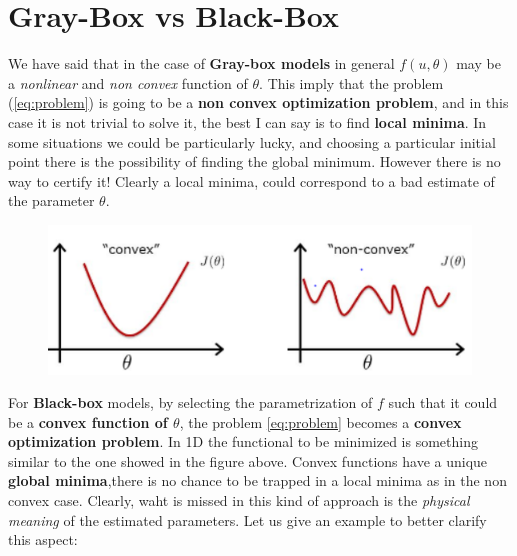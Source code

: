 \section{Gray-Box vs Black-Box}
We have said that in the case of \textbf{Gray-box models} in general $f(u,\theta)$ may be a \textit{nonlinear} and \textit{non convex} function of $\theta$. This imply that the problem (\ref{eq:problem}) is going to be a \textbf{non convex optimization problem}, and in this case it is not trivial to solve it, the best I can say is to find \textbf{local minima}. In some situations we could be particularly lucky, and choosing a particular initial point there is the possibility of finding  the global minimum. However there is no way to certify it! Clearly a local minima, could correspond to a bad estimate of the parameter $\theta$.

\begin{figure}[h]
    \centering
    \includegraphics[scale=1]{img/cvx_nocvx.png}
\end{figure}

For \textbf{Black-box} models, by selecting the parametrization of $f$ such that it could be a \textbf{convex function of $\theta$}, the problem \ref{eq:problem} becomes a \textbf{convex optimization problem}. In 1D the functional to be minimized is something similar to the one showed in the figure above. Convex functions have a  unique \textbf{global minima},there is no chance to be trapped in a local minima as in the non convex case. Clearly, waht is missed in this kind of approach is the \textit{physical meaning} of the estimated parameters. Let us give an example to better clarify this aspect: 

